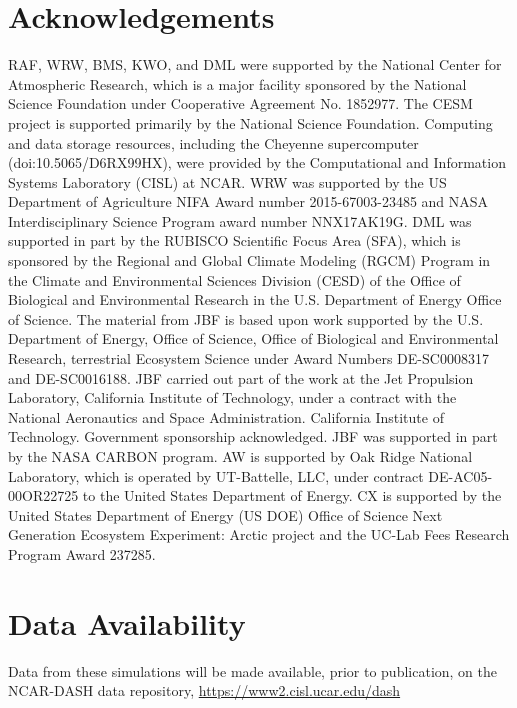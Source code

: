 \documentclass[draft,linenumbers]{agujournal}
\begin{document}
\section{Acknowledgements}
RAF, WRW, BMS, KWO, and DML were supported by the National Center for Atmospheric Research, which is a major facility sponsored by the National Science Foundation under Cooperative Agreement No. 1852977. The CESM project is supported primarily by the National Science Foundation.  Computing and data storage resources, including the Cheyenne supercomputer (doi:10.5065/D6RX99HX), were provided by the Computational and Information Systems Laboratory (CISL) at NCAR. WRW was supported by the US Department of Agriculture NIFA Award number 2015-67003-23485 and NASA Interdisciplinary Science Program award number NNX17AK19G. DML was supported in part by the RUBISCO Scientific Focus Area (SFA), which is sponsored by the Regional and Global Climate Modeling (RGCM) Program in the Climate and Environmental Sciences Division (CESD) of the Office of Biological and Environmental Research in the U.S. Department of Energy Office of Science. The material from JBF is based upon work supported by the U.S. Department of Energy, Office of Science, Office of Biological and Environmental Research, terrestrial Ecosystem Science under Award Numbers DE-SC0008317 and DE-SC0016188. JBF carried out part of the work at the Jet Propulsion Laboratory, California Institute of Technology, under a contract with the National Aeronautics and Space Administration. California Institute of Technology. Government sponsorship acknowledged. JBF was supported in part by the NASA CARBON program. AW is supported by Oak Ridge National Laboratory, which is operated by UT-Battelle, LLC, under contract DE-AC05-00OR22725 to the United States Department of Energy. CX is supported by the United States Department of Energy (US DOE) Office of Science Next Generation Ecosystem Experiment: Arctic project and the UC-Lab Fees Research Program Award 237285.

\section{Data Availability}
Data from these simulations will be made available, prior to publication, on the NCAR-DASH data repository, \url{https://www2.cisl.ucar.edu/dash}

\nocite{*}

\clearpage
\end{document}
